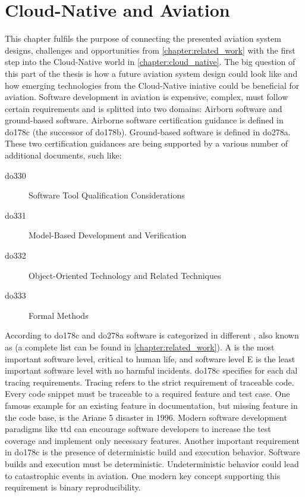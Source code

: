 \documentclass[titlepage]{report}
\begin{document}
\chapter{Cloud-Native and Aviation}
This chapter fulfils the purpose of connecting the presented aviation system designs, challenges and opportunities from \autoref{chapter:related_work} with the first step into the Cloud-Native world in \autoref{chapter:cloud_native}.
The big question of this part of the thesis is how a future aviation system design could look like and how emerging technologies from the Cloud-Native iniative could be beneficial for aviation. Software development in aviation is expensive,
complex, must follow certain requirements and is splitted into two domains: Airborn software and ground-based software. Airborne software certification guidance is defined in \gls{do178c} (the successor of \gls{do178b}).
Ground-based software is defined in \gls{do278a}. These two certification guidances are being supported by a various number of additional documents, such like:
\begin{description}
  \item[\gls{do330}] Software Tool Qualification Considerations
  \item[\gls{do331}] Model-Based Development and Verification
  \item[\gls{do332}] Object-Oriented Technology and Related Techniques
  \item[\gls{do333}] Formal Methods
\end{description}
According to \gls{do178c} and \gls{do278a} software is categorized in different , also known as  (a complete list can be found in \autoref{chapter:related_work}). A is the most important software level, critical to
human life, and software level E is the least important software level with no harmful incidents. \gls{do178c} specifies for each \gls{dal} tracing requirements. Tracing refers to the strict requirement of traceable code. Every code snippet
must be traceable to a required feature and test case\cite{brosgol2010178c}. One famous example for an existing feature in documentation, but missing feature in the code base, is the Ariane 5 disaster in 1996\cite{dalal2012case}. Modern
software development paradigms like \gls{ttd} can encourage software developers to increase the test coverage and implement only necessary features\cite{panvcur2011impact}. Another important requirement in \gls{do178c} is the presence
of deterministic build and execution behavior. Software builds and execution must be deterministic. Undeterministic behavior could lead to catastrophic events in aviation. One modern key concept supporting this requirement is binary reproducibility.
\end{document}
